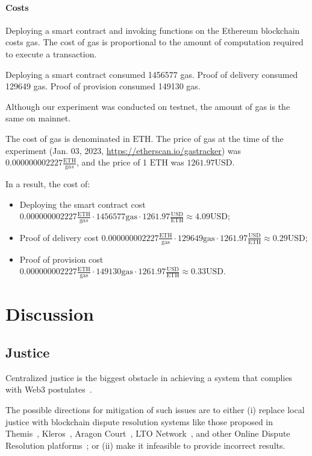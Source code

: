 \documentclass[pdftex,twocolumn,epjc3]{svjour3}
\begin{document}
{\paragraph{Costs}
Deploying a smart contract and invoking functions on the Ethereum blockchain costs gas. The cost of gas is proportional to the amount of computation required to execute a transaction. 

Deploying a smart contract consumed 1456577 gas.
Proof of delivery consumed 129649 gas.
Proof of provision consumed 149130 gas.

Although our experiment was conducted on testnet, the amount of gas is the same on mainnet.

The cost of gas is denominated in $\mathrm{ETH}$. The price of gas at the time of the experiment (Jan. 03, 2023, \url{https://etherscan.io/gastracker}) was $0.000000002227 \frac{\mathrm{ETH}}{\mathrm gas}$, and the price of 1 $\mathrm{ETH}$ was $1261.97 \mathrm{USD}$.

In a result, the cost of:
\begin{itemize}
  \item Deploying the smart contract cost $0.000000002227 \frac{\mathrm{ETH}}{\mathrm gas} \cdot 1456577 \mathrm{gas} \cdot 1261.97 \frac{\mathrm{USD}}{\mathrm{ETH}} \approx 4.09 \mathrm{USD}$; 
  \item Proof of delivery cost $0.000000002227 \mathrm{\frac{ETH}{gas}} \cdot 129649 \mathrm{gas} \cdot 1261.97 \frac{\mathrm{USD}}{\mathrm{ETH}} \approx 0.29 \mathrm{USD}$; 
  \item Proof of provision cost $0.000000002227 \mathrm{\frac{ETH}{gas}} \cdot 149130 \mathrm{gas} \cdot 1261.97 \frac{\mathrm{USD}}{\mathrm{ETH}} \approx 0.33 \mathrm{USD}$.
\end{itemize}


\section{Discussion}
\label{sec:discussion}

\subsection{Justice}\label{sec:decentralised-justice}

Centralized justice is the biggest obstacle in achieving a system that complies with Web3 postulates~\cite{ethereumWhatWeb3Why2023}.

The possible directions for mitigation of such issues are to either (i) replace local justice with blockchain dispute resolution systems like those proposed in Themis~\cite{mengThemisDecentralizedEscrow2019}, Kleros~\cite{bergollaKlerosSociolegalCase2022,gudkovCrowdArbitrationBlockchain2020}, Aragon Court~\cite{aragonDecentralizedDisputeResolution}, LTO Network~\cite{ltonetworkNextGenBlockchainB2B}, and other Online Dispute Resolution platforms~\cite{allenGovernanceBlockchainDispute2019}; or (ii) make it infeasible to provide incorrect results.

}
\end{document}
